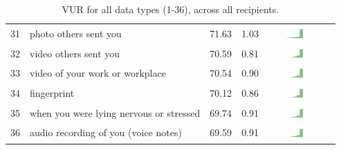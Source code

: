 \begin{table}[t]
\begin{center}
\begin{tabular}{| r | l | r | r | r | r |}
31 & photo others sent you & 71.63 & 1.03 & \includegraphics[width = 2cm, height = 0.5cm]{tex-inputs/table-images/sharedphotosotherssenttoyousavedonyourdevicecombined} \\ 
32 & video others sent you & 70.59 & 0.81 & \includegraphics[width = 2cm, height = 0.5cm]{tex-inputs/table-images/sharedvideosotherssentyousavedonyourdevicecombined} \\ 
33 & video of your work or workplace & 70.54 & 0.90 & \includegraphics[width = 2cm, height = 0.5cm]{tex-inputs/table-images/tookvideosatwork(withanoutward-facingcamera)combined} \\ 
34 & fingerprint & 70.12 & 0.86 & \includegraphics[width = 2cm, height = 0.5cm]{tex-inputs/table-images/learnedyourfingerprintsomehowcombined} \\ 
35 & when you were lying nervous or stressed & 69.74 & 0.91 & \includegraphics[width = 2cm, height = 0.5cm]{tex-inputs/table-images/learnedwhenyouwerelyingnervousorstressedcombined} \\ 
36 & audio recording of you (voice notes) & 69.59 & 0.91 & \includegraphics[width = 2cm, height = 0.5cm]{tex-inputs/table-images/recordedyoutalkingtoyourself(makingvoicenotes)combined} \\ 
\hline
\end{tabular}
\caption{VUR for all data types (1-36), across all recipients.}
\label{full-vur-table}
\end{center}
\end{table}

